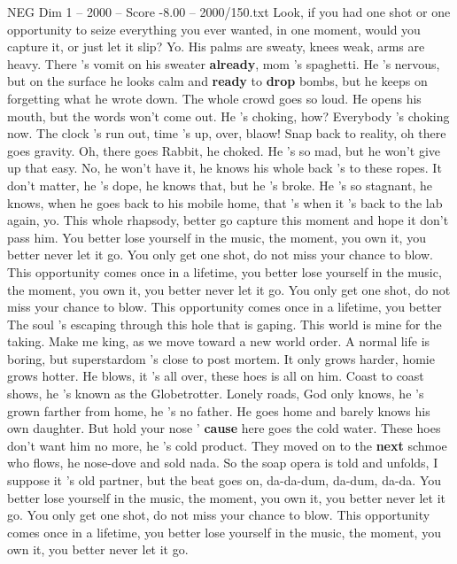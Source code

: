 \begin{textsample}{NEG Dim 1 – 2000 – Score -8.00 – 2000/150.txt}  \label{ex:f1_neg_018}
Look, if you had one shot or one opportunity to seize everything you ever wanted, in one moment, would you capture it, or just let it slip?
Yo.
His palms are sweaty, knees weak, arms are heavy.
There 's vomit on his sweater \textbf{already}, mom 's spaghetti.
He 's nervous, but on the surface he looks calm and \textbf{ready} to \textbf{drop} bombs, but he keeps on forgetting what he wrote down.
The whole crowd goes so loud.
He opens his mouth, but the words won't come out.
He 's choking, how?
Everybody 's choking now.
The clock 's run out, time 's up, over, blaow!
Snap back to reality, oh there goes gravity.
Oh, there goes Rabbit, he choked.
He 's so mad, but he won't give up that easy.
No, he won't have it, he knows his whole back 's to these ropes.
It don't matter, he 's dope, he knows that, but he 's broke.
He 's so stagnant, he knows, when he goes back to his mobile home, that 's when it 's back to the lab again, yo.
This whole rhapsody, better go capture this moment and hope it don't pass him.
You better lose yourself in the music, the moment, you own it, you better never let it go.
You only get one shot, do not miss your chance to blow.
This opportunity comes once in a lifetime, you better lose yourself in the music, the moment, you own it, you better never let it go.
You only get one shot, do not miss your chance to blow.
This opportunity comes once in a lifetime, you better The soul 's escaping through this hole that is gaping.
This world is mine for the taking.
Make me king, as we move toward a new world order.
A normal life is boring, but superstardom 's close to post mortem.
It only grows harder, homie grows hotter.
He blows, it 's all over, these hoes is all on him.
Coast to coast shows, he 's known as the Globetrotter.
Lonely roads, God only knows, he 's grown farther from home, he 's no father.
He goes home and barely knows his own daughter.
But hold your nose ' \textbf{cause} here goes the cold water.
These hoes don't want him no more, he 's cold product.
They moved on to the \textbf{next} schmoe who flows, he nose-dove and sold nada.
So the soap opera is told and unfolds, I suppose it 's old partner, but the beat goes on, da-da-dum, da-dum, da-da.
You better lose yourself in the music, the moment, you own it, you better never let it go.
You only get one shot, do not miss your chance to blow.
This opportunity comes once in a lifetime, you better lose yourself in the music, the moment, you own it, you better never let it go.

\end{textsample}
